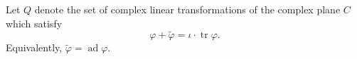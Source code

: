 Let $Q$ denote the set of complex linear transformations of the complex plane $C$ which satisfy
$$
\varphi + \tilde{\varphi} = \iota \cdot \operatorname{tr} \varphi.
$$
Equivalently, $\tilde{\varphi} = \operatorname{ad} \varphi$.
